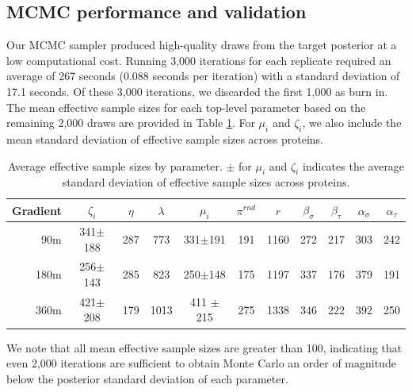 



\subsection{MCMC performance and validation}
\label{proteomics:sec:mcmc_performance}

Our MCMC sampler produced high-quality draws from the target posterior at a low computational cost.
Running 3,000 iterations for each replicate required an average of 267 seconds (0.088 seconds per iteration) with a standard deviation of 17.1 seconds.
Of these 3,000 iterations, we discarded the first 1,000 as burn in.
The mean effective sample sizes for each top-level parameter based on the remaining 2,000 draws are provided in Table \ref{proteomics:tab:effective_sample_sizes}.
For $\mu_i$ and $\zeta_i$, we also include the mean standard deviation of effective sample sizes across proteins.
%
\ifx\nofigures\undefined
\begin{table}
\centering
\caption{Average effective sample sizes by parameter. $\pm$ for $\mu_{i}$
and $\zeta_{i}$ indicates the average standard deviation of effective
sample sizes across proteins. \label{proteomics:tab:effective_sample_sizes}}
\begin{tabular}{r|cccccccccc}
\hline 
Gradient  & $\zeta_{i}$ & $\eta$  & $\lambda$ & $\mu_i$  & $\pi^{rnd}$ & $r$ & $\beta_{\sigma}$ & $\beta_{\tau}$ & $\alpha_{\sigma}$ & $\alpha_{\tau}$\tabularnewline
\hline 
90m  & 341$\pm$188  & 287  & 773  & 331$\pm$191 & 191  & 1160  & 272  & 217  & 303  & 242 \tabularnewline
180m  & 256$\pm$143 & 285  & 823  & 250$\pm$148 & 175  & 1197  & 337  & 176  & 379  & 191 \tabularnewline
360m  & 421$\pm$208 & 179  & 1013  & 411 $\pm$215 & 275  & 1338  & 346  & 222  & 392  & 250 \tabularnewline
\hline 
\end{tabular}
\end{table}
\fi
%
We note that all mean effective sample sizes are greater than 100, indicating that even 2,000 iterations are sufficient to obtain Monte Carlo  an order of magnitude below the posterior standard deviation of each parameter.


